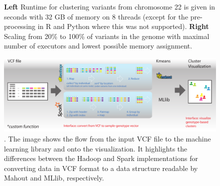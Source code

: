 \documentclass{bmcart}
\begin{document}
\begin{backmatter}
\begin{figure}[h!]
  \caption{
      {\bf Left} Runtime for clustering variants from chromosome 22 is given in seconds with 32 GB of memory on 8 threads (except for the pre-processing in R and Python where this was not supported). 
      {\bf Right} Scaling from 20\% to 100\% of variants in the genome with maximal number of executors and lowest possible memory assignment.}
      \end{figure}

\begin{figure}[h!]
\includegraphics[type=pdf,ext=.pdf,read=.pdf, scale=0.25]{signature}
\caption{. The image shows the flow from the input VCF file to the machine learning library and onto the visualization. It highlights the differences between the Hadoop and Spark implementations for converting data in VCF format to a data structure readable by Mahout and MLlib, respectively.}
      \end{figure}


\end{backmatter}
\end{document}
